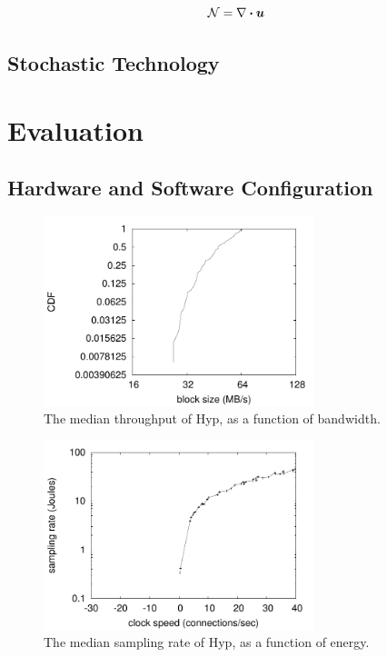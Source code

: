 \begin{equation}
	\mathcal{N} = \nabla\boldsymbol{\cdot}\boldsymbol{u}
	\label{eq:eq2}
\end{equation}


\section{Stochastic Technology}
%


\chapter{Evaluation}
%



\section{Hardware and Software Configuration}
%
\begin{figure}[htpb]
	\centering
	\includegraphics[width=0.7\textwidth]{figure0}
	\caption{%
	The median throughput of Hyp, as a function of bandwidth.
	}
	\label{fig:introLabel2}
\end{figure}



\begin{figure}[htpb]
	\centering
	\includegraphics[width=0.7\textwidth]{figure1}
	\caption{%
	The median sampling rate of Hyp, as a function of energy.
	}
	\label{fig:introLabel3}
\end{figure}



